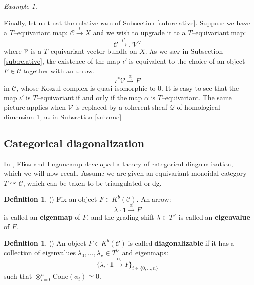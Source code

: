 \documentclass[12pt]{amsart}
\numberwithin{equation}{section}
\theoremstyle{definition}
\newtheorem{definition}[theorem]{Definition}
\theoremstyle{remark}
\newtheorem{example}[theorem]{Example}
\newcommand{\CC}{\mathbb{C}}
\newcommand{\PP}{\mathbb{P}}
\newcommand{\cat}{\mathcal{C}}
\newcommand{\CQ}{\mathcal{Q}}
\newcommand{\CV}{\mathcal{V}}
\renewcommand{\1}{\mathbf{1}}
\newcommand{\coh}{\mathrm{Coh}}
\newcommand{\cone}{\mathrm{Cone}}
\newcommand{\SBim}{\mathrm{SBim}}
\begin{document}
\begin{example}
\label{ex:equivrelative} 

Finally, let us treat the relative case of Subsection \ref{sub:relative}. Suppose we have a $T$--equivariant map:
$
\cat \stackrel{\iota}\longrightarrow X
$
and we wish to upgrade it to a $T$--equivariant map:
$$
\cat \stackrel{\iota'}\longrightarrow \PP \CV^{\vee}
$$
where $\CV$ is a $T$--equivariant vector bundle on $X$. As we saw in Subsection \ref{sub:relative}, the existence of the map $\iota'$ is equivalent to the choice of an object $F \in \cat$ together with an arrow:
$$
\iota^* \CV \stackrel{\alpha}\longrightarrow F
$$
in $\cat$, whose Koszul complex is quasi-isomorphic to 0. It is easy to see that the map $\iota'$ is $T$--equivariant if and only if the map $\alpha$ is $T$--equivariant. The same picture applies when $\CV$ is replaced by a coherent sheaf $\CQ$ of homological dimension 1, as in Subsection \ref{sub:one}.

\end{example}

\subsection{Categorical diagonalization}
\label{sub:cat diag}

In \cite{EH}, Elias and Hogancamp developed a theory of categorical diagonalization, which we will now recall. Assume we are given an equivariant monoidal category $T \curvearrowright \cat$, which can be taken to be triangulated or dg. %

\begin{definition}(\cite{EH})
\label{def:EH1}
Fix an object $F \in K^b(\cat)$. An arrow:
\begin{equation}
\label{eqn:eigenmap}
\lambda\cdot \1 \stackrel{\alpha}\longrightarrow F
\end{equation}
is called an {\bf eigenmap} of $F$, and the grading shift $\lambda \in T^\vee$ is called an {\bf eigenvalue} of $F$.  
\end{definition}

\begin{definition}(\cite{EH})
\label{def:EH2}
An object $F \in K^b(\cat)$ is called {\bf diagonalizable} if it has a collection of eigenvalues $\lambda_0,...,\lambda_n \in T^\vee$ and eigenmaps:
$$
\Big\{ \lambda_i \cdot \1 \stackrel{\alpha_i}\to F \Big\}_{i\in \{0,...,n\}}
$$
such that $\otimes_{i=0}^n \cone(\alpha_i) \simeq 0$. 
\end{definition}
\end{document}
